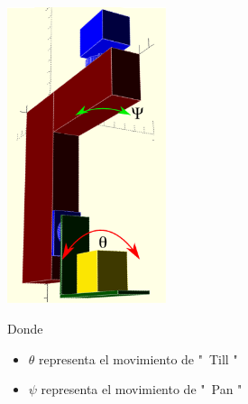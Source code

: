 \begin{center}
	\includegraphics[width=0.35\textwidth]{Contenido/Cuerpo/Capitulo5/Fig15.eps}
	\label{Fig1}
\end{center}
Donde 
\begin{itemize}
	\item $\theta$ representa el movimiento de "\ Till "
	\item $\psi$ representa el movimiento de "\ Pan  "
\end{itemize}





